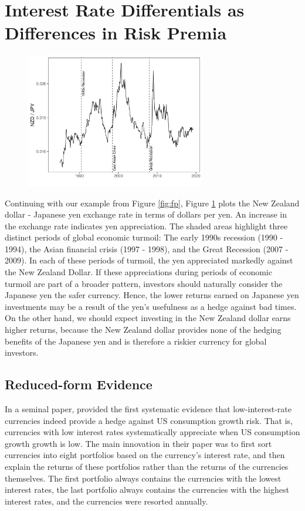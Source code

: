 \documentclass[12pt,letter]{article}
\theoremstyle{break} \theorembodyfont{\normalfont\itshape}
\theoremstyle{break}
\theoremstyle{break} \theorembodyfont{\normalfont\itshape}
\theoremstyle{break} \theorembodyfont{\normalfont\itshape}
\begin{document}
\section{Interest Rate Differentials as Differences in Risk Premia}

\begin{figure}
    \centering
    \includegraphics[width=0.7\textwidth]{Exhibits/Figure_FX_JPYNZD.pdf}
    \label{fig:spot}
\end{figure}
Continuing with our example from Figure \ref{fig:fp}, Figure \ref{fig:spot} plots the New
Zealand dollar - Japanese yen exchange rate in terms of dollars per
yen. An increase in the exchange rate indicates yen appreciation.
The shaded areas highlight three distinct periods of global economic
turmoil: The early 1990s recession (1990 - 1994), the Asian financial
crisis (1997 - 1998), and the Great Recession (2007 - 2009). In each of these periods of turmoil, the yen appreciated markedly against the New Zealand Dollar. If these appreciations during periods of economic
turmoil are part of a broader pattern, investors should naturally consider the Japanese yen the safer
currency. Hence, the lower returns earned on Japanese yen investments 
may be a result of the yen's usefulness as a hedge against bad times. 
On the other hand, we should expect investing in the New Zealand dollar 
earns higher returns, because the New Zealand dollar provides none of 
the hedging benefits of the Japanese yen and is therefore a riskier 
currency for global investors.

\subsection{Reduced-form Evidence}

In a seminal paper, \citet{LustigVerdelhan2007} provided  the first systematic evidence 
that low-interest-rate currencies indeed provide a hedge against US consumption growth risk. That is, currencies with low interest rates systematically appreciate when US consumption growth growth is low. 
The main innovation in their paper was to first sort currencies into eight 
portfolios based on the currency's interest rate, and then explain the returns 
of these portfolios rather than the returns of the currencies themselves. The 
first portfolio always contains the currencies with the lowest interest rates, 
the last portfolio always contains the currencies with the highest interest 
rates, and the currencies were resorted annually.
\end{document}
